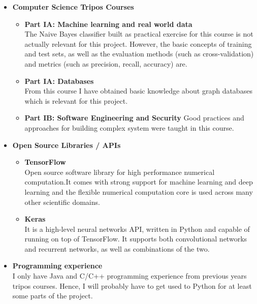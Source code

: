 \begin{itemize}
  \item \textbf{Computer Science Tripos Courses}

        \begin{itemize}
          \item \textbf{Part IA: Machine learning and real world data} \\
                The Naive Bayes classifier built as practical exercise for this course is not actually relevant for this project. However, the basic concepts of training and test sets, as well as the evaluation methods (such as cross-validation) and metrics (such as precision, recall, accuracy) are.
          \item \textbf{Part IA: Databases} \\
                From this course I have obtained basic knowledge about graph databases which is relevant for this project.
          \item \textbf{Part IB: Software Engineering and Security}
                Good practices and approaches for building complex system were taught in this course. \\

        \end{itemize}

  \item \textbf{Open Source Libraries / APIs}

        \begin{itemize}
          \item \textbf{TensorFlow} \\
                Open source software library for high performance numerical computation.It comes with strong support for machine learning and deep learning and the flexible numerical computation core is used across many other scientific domains.

          \item \textbf{Keras} \\
                It is a high-level neural networks API, written in Python and capable of running on top of TensorFlow. It supports both convolutional networks and recurrent networks, as well as combinations of the two. \\
        \end{itemize}

  \item \textbf{Programming experience} \\
        I only have Java and C/C++ programming experience from previous years tripos courses. Hence, I will probably have to get used to Python for at least some parts of the project. \\

\end{itemize}

